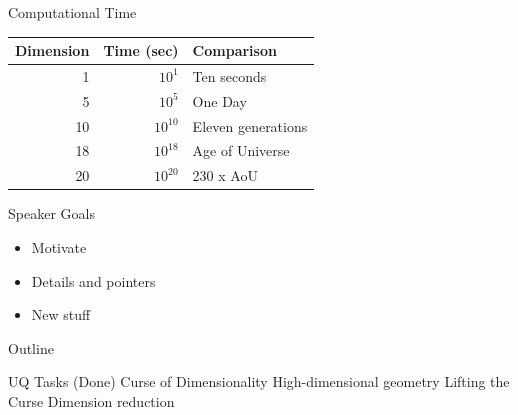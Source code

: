 \documentclass[14pt]{beamer}
\begin{document}
\begin{frame}{Computational Time}
  \begin{table}
    \begin{tabular}{r|r|l}
    \hline
    Dimension & Time (sec) & Comparison\\
    \hline
    1 & $10^{1}$ & Ten seconds\\
    \hline
    5 & $10^{5}$ & One Day\\
    \hline
    10 & $10^{10}$ & Eleven generations\\
    \hline
    18 & $10^{18}$ & Age of Universe\\
    \hline
    20 & $10^{20}$ & 230 x AoU\\
    \hline
    \end{tabular}
  \end{table}
\end{frame}



\begin{frame}{Speaker Goals}
  \begin{itemize}
  \item Motivate
  \item Details and pointers
  \item New stuff
  \end{itemize}
\end{frame}

\begin{frame}{Outline}
  \begin{outline}
  \1 UQ Tasks (Done)
  \1 Curse of Dimensionality
    \2 High-dimensional geometry
  \1 Lifting the Curse
    \2 Dimension reduction
  \end{outline}
\end{frame}
\end{document}
